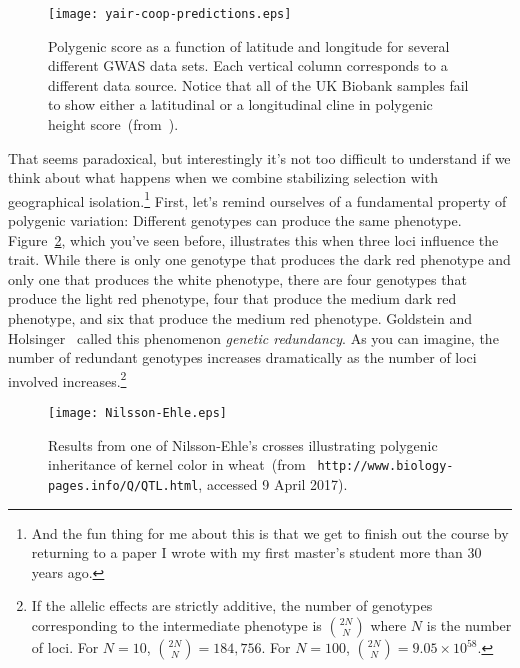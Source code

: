 \documentclass[12pt]{article}
\begin{document}
\begin{figure}
  \begin{center}
    \texttt{[image: yair-coop-predictions.eps]}
  \end{center}
  \caption{Polygenic score as a function of latitude and longitude for
    several different GWAS data sets. Each vertical column corresponds
  to a different data source. Notice that all of the UK Biobank
  samples fail to show either a latitudinal or a longitudinal cline in
  polygenic height score~(from~\cite{Yair-Coop-2021}).}\label{fig:UK-biobank} 
\end{figure}

That seems paradoxical, but interestingly it's not too difficult to
understand if we think about what happens when we combine stabilizing
selection with geographical isolation.\footnote{And the fun thing for
  me about this is that we get to finish out the course by returning
  to a paper I wrote with my first master's student more than 30 years
  ago.} First, let's remind ourselves of a fundamental property of
polygenic variation: Different genotypes can produce the same
phenotype. Figure~\ref{fig:redundancy}, which you've seen before,
illustrates this when three loci influence the trait. While there is
only one genotype that produces the dark red phenotype and only one
that produces the white phenotype, there are four genotypes that
produce the light red phenotype, four that produce the medium dark red
phenotype, and six that produce the medium red phenotype. Goldstein
and Holsinger~\cite{Goldstein-Holsinger-1992} called this phenomenon
{\it genetic redundancy}. As you can
imagine, the number of redundant genotypes increases dramatically as
the number of loci involved increases.\footnote{If the allelic effects
  are strictly additive, the number of genotypes corresponding to the
  intermediate phenotype is $2N \choose N$ where $N$ is the number of
  loci. For $N=10$, ${2N \choose N} = 184,756$. For $N=100$, ${2N \choose
  N} = 9.05 \times 10^{58}$.}

\begin{figure}
  \begin{center}
    \texttt{[image: Nilsson-Ehle.eps]}
  \end{center}
  \caption{Results from one of Nilsson-Ehle's crosses illustrating
    polygenic inheritance of kernel color in wheat~(from {\tt
      http://www.biology-pages.info/Q/QTL.html}, accessed 9 April 2017).}\label{fig:redundancy}
\end{figure}
\end{document}
